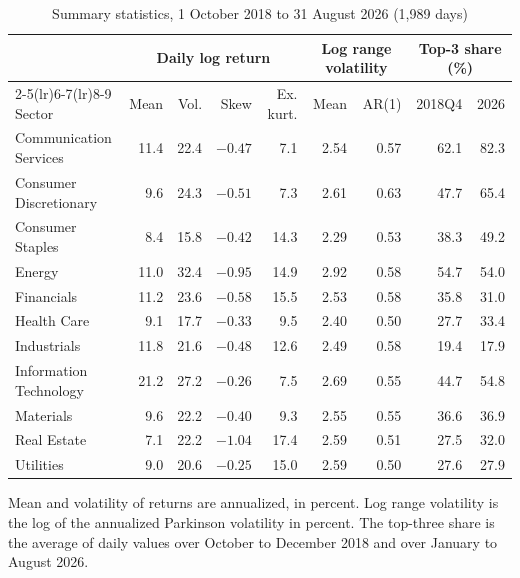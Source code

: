 \documentclass[11pt]{article}
\begin{document}
\begin{table}[H]
\centering
\caption{Summary statistics, 1 October 2018 to 31 August 2026 (1,989 days)}
\label{tab:desc}
\small
\begin{tabular}{lrrrrrrrr}
\toprule
& \multicolumn{4}{c}{Daily log return} & \multicolumn{2}{c}{Log range volatility} & \multicolumn{2}{c}{Top-3 share (\%)} \\
\cmidrule(lr){2-5}\cmidrule(lr){6-7}\cmidrule(lr){8-9}
Sector & Mean & Vol. & Skew & Ex. kurt. & Mean & AR(1) & 2018Q4 & 2026 \\
\midrule
Communication Services & 11.4 & 22.4 & $-0.47$ & 7.1 & 2.54 & 0.57 & 62.1 & 82.3 \\
Consumer Discretionary & 9.6 & 24.3 & $-0.51$ & 7.3 & 2.61 & 0.63 & 47.7 & 65.4 \\
Consumer Staples & 8.4 & 15.8 & $-0.42$ & 14.3 & 2.29 & 0.53 & 38.3 & 49.2 \\
Energy & 11.0 & 32.4 & $-0.95$ & 14.9 & 2.92 & 0.58 & 54.7 & 54.0 \\
Financials & 11.2 & 23.6 & $-0.58$ & 15.5 & 2.53 & 0.58 & 35.8 & 31.0 \\
Health Care & 9.1 & 17.7 & $-0.33$ & 9.5 & 2.40 & 0.50 & 27.7 & 33.4 \\
Industrials & 11.8 & 21.6 & $-0.48$ & 12.6 & 2.49 & 0.58 & 19.4 & 17.9 \\
Information Technology & 21.2 & 27.2 & $-0.26$ & 7.5 & 2.69 & 0.55 & 44.7 & 54.8 \\
Materials & 9.6 & 22.2 & $-0.40$ & 9.3 & 2.55 & 0.55 & 36.6 & 36.9 \\
Real Estate & 7.1 & 22.2 & $-1.04$ & 17.4 & 2.59 & 0.51 & 27.5 & 32.0 \\
Utilities & 9.0 & 20.6 & $-0.25$ & 15.0 & 2.59 & 0.50 & 27.6 & 27.9 \\
\bottomrule
\end{tabular}

\smallskip
\parbox{0.95\textwidth}{\footnotesize Mean and volatility of returns are annualized, in percent. Log range volatility is the log of the annualized Parkinson volatility in percent. The top-three share is the average of daily values over October to December 2018 and over January to August 2026.}
\end{table}
\end{document}
